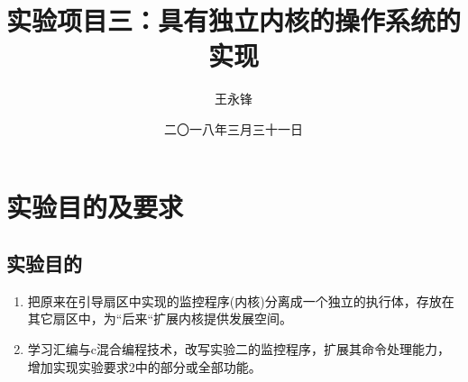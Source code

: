 \documentclass[forprint]{WHUBachelor}
\begin{document}

\title{实验项目三：具有独立内核的操作系统的实现}
\author{王永锋}                            %
\date{二〇一八年三月三十一日}                %

\maketitle
\frontmatter
{}              %
\tableofcontents
\mainmatter %

\chapter{实验目的及要求}

\section{实验目的}

\begin{enumerate}
  \item 把原来在引导扇区中实现的监控程序(内核)分离成一个独立的执行体，存放在其它扇区中，为“后来“扩展内核提供发展空间。
  \item 学习汇编与c混合编程技术，改写实验二的监控程序，扩展其命令处理能力，增加实现实验要求2中的部分或全部功能。
\end{enumerate}
\end{document}
